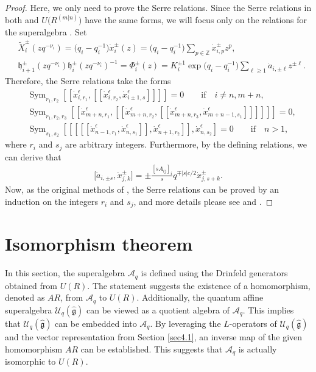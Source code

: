 \documentclass[10pt,a4paper]{amsart}
\numberwithin{equation}{section}
\begin{document}
\begin{proof} Here, we only need to prove the Serre relations. Since the Serre relations in both  and $U\bigl(R^{(m|n)}\bigr) $ have the same forms, we will focus only on the relations for the superalgebra . Set
\begin{align*}
 &\widetilde{X}_i^{\pm}(zq^{-\nu_i})=\bigl(q_i-q_i^{-1}\bigr)\dot{x}_i^{\pm}(z)=\bigl(q_i-q_i^{-1}\bigr)\sum_{p\in\mathbb{Z}}\dot{x}_{i,p}^{\pm}z^{p},\\
 &\mathfrak{h}_{i+1}^{\pm}(zq^{-\nu_i})\mathfrak{h}_{i}^{\pm}(zq^{-\nu_i})^{-1}=\Phi^{\pm}_{i}(z)=K_i^{\pm 1}\exp\bigl(q_i-q_i^{-1}\bigr)\sum\limits_{\ell\geq 1}\dot{a}_{i,\pm \ell}z^{\pm \ell}.
\end{align*}
Therefore, the Serre relations take the forms
\begin{align*}
 &\operatorname{Sym}_{r_1,r_2}[\![\dot{x}_{i,r_1}^{\epsilon},[\![\dot{x}_{i,r_2}^{\epsilon}, \dot{x}_{i\pm 1,s}^{\epsilon}]\!] ]\!]=0\qquad\textrm{if}\quad i\neq n,m+n, \\
&\operatorname{Sym}_{r_1,r_2,r_3}[\![\dot{x}_{m+n,r_1}^{\epsilon}, [\![\dot{x}_{m+n,r_2}^{\epsilon},[\![\dot{x}_{m+n,r_3}^{\epsilon}, \dot{x}_{m+n-1,s_1}^{\epsilon}]\!] ]\!] ]\!]=0, \\
&\operatorname{Sym}_{s_1,s_2}[ [\![ [\![\dot{x}_{n-1,r_1}^{\epsilon}, \dot{x}_{n,s_1}^{\epsilon}]\!], \dot{x}_{n+1,r_2}^{\epsilon}]\!], \dot{x}_{n,s_2}^{\epsilon}]=0
\qquad\textrm{if}\quad n>1,
\end{align*}
where $r_i$ and $s_j$ are arbitrary integers. Furthermore, by the defining relations,
 we can derive that
\begin{gather*}
 \bigl[\dot{a}_{i,\pm s}, \dot{x}_{j,k}^{\pm}\bigr]=\pm\frac{[sA_{ij}]_{i}}{s}q^{\mp|s|c/2}\dot{x}_{j,s+k}^{\pm}.
\end{gather*}
Now, as the original methods of \cite{SZLO}, the Serre relations can be proved by an induction on the integers $r_i$ and $s_j$, and more details please see \cite[Section 5.1]{XWLHZ} and \cite[Section 4]{LYZ}.
\end{proof}




\section{Isomorphism theorem }\label{sec6}

In this section, the superalgebra $\mathcal{A}_q$ is defined using the Drinfeld generators obtained from $U(R)$. The statement suggests the existence of a homomorphism, denoted as $AR$, from $\mathcal{A}_q$ to $U(R)$. Additionally, the quantum affine superalgebra $\mathcal{U}_q(\mathfrak{\hat{g}})$ can be viewed as a quotient algebra of $\mathcal{A}_q$. This implies that $\mathcal{U}_q(\mathfrak{\hat{g}})$ can be embedded into $\mathcal{A}_q$. By leveraging the $L$-operators of $\mathcal{U}_q(\mathfrak{\hat{g}})$ and the vector representation from Section \ref{sec4.1}, an inverse map of the given homomorphism $AR$ can be established. This suggests that $\mathcal{A}_q$ is actually isomorphic to $U(R)$.
\end{document}
